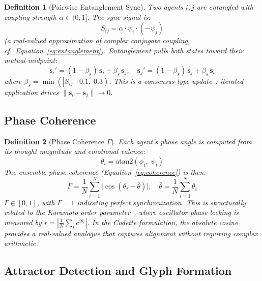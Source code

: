 \documentclass[11pt,a4paper]{article}
\newtheorem{definition}{Definition}[section]
\begin{document}
\begin{definition}[Pairwise Entanglement Sync]
Two agents $i, j$ are entangled with coupling strength $\alpha \in (0, 1]$. The sync signal is:
\begin{equation}
  S_{ij} = \alpha \cdot \psi_i \cdot (-\psi_j)
  \label{eq:entangle_formal}
\end{equation}
(a real-valued approximation of complex conjugate coupling, cf.\ Equation~\ref{eq:entanglement}). Entanglement pulls both states toward their mutual midpoint:
\begin{equation}
  \mathbf{s}_i' = (1 - \beta_s)\,\mathbf{s}_i + \beta_s\,\mathbf{s}_j, \quad
  \mathbf{s}_j' = (1 - \beta_s)\,\mathbf{s}_j + \beta_s\,\mathbf{s}_i
  \label{eq:entangle_update}
\end{equation}
where $\beta_s = \min(|S_{ij}| \cdot 0.1,\; 0.3)$. This is a consensus-type update~\citep{ren2005consensus}: iterated application drives $\|\mathbf{s}_i - \mathbf{s}_j\| \to 0$.
\end{definition}

\subsection{Phase Coherence}

\begin{definition}[Phase Coherence $\Gamma$]
Each agent's phase angle is computed from its thought magnitude and emotional valence:
\begin{equation}
  \theta_i = \text{atan2}(\phi_i,\; \psi_i)
  \label{eq:phase_angle}
\end{equation}
The ensemble phase coherence (Equation~\ref{eq:coherence}) is then:
\begin{equation}
  \Gamma = \frac{1}{N} \sum_{i=1}^{N} \bigl|\cos(\theta_i - \bar{\theta})\bigr|, \quad \bar{\theta} = \frac{1}{N} \sum_{i=1}^{N} \theta_i
  \label{eq:gamma_formal}
\end{equation}
$\Gamma \in [0, 1]$, with $\Gamma = 1$ indicating perfect synchronization. This is structurally related to the Kuramoto order parameter~\citep{kuramoto1984chemical,acebron2005kuramoto}, where oscillator phase locking is measured by $r = |\frac{1}{N}\sum_i e^{i\theta_i}|$. In the Codette formulation, the absolute cosine provides a real-valued analogue that captures alignment without requiring complex arithmetic.
\end{definition}

\subsection{Attractor Detection and Glyph Formation}
\end{document}
